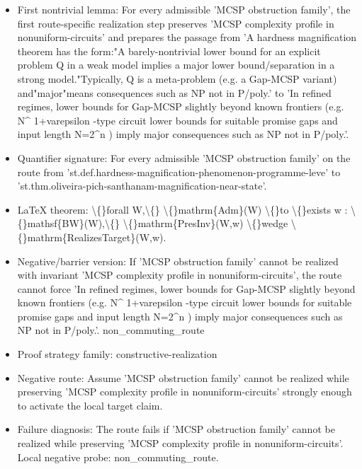 \documentclass[11pt]{article}
\begin{document}
\begin{itemize}
\item First nontrivial lemma: For every admissible 'MCSP obstruction family', the first route-specific realization step preserves 'MCSP complexity profile in nonuniform-circuits' and prepares the passage from 'A hardness magnification theorem has the form:"A barely-nontrivial lower bound for an explicit problem Q in a weak model implies a major lower bound/separation in a strong model."Typically, Q is a meta-problem (e.g. a Gap-MCSP variant) and"major"means consequences such as NP not in P/poly.' to 'In refined regimes, lower bounds for Gap-MCSP slightly beyond known frontiers (e.g. N\textasciicircum{} 1+varepsilon -type circuit lower bounds for suitable promise gaps and input length N=2\textasciicircum{}n ) imply major consequences such as NP not in P/poly.'.
\item Quantifier signature: For every admissible 'MCSP obstruction family' on the route from 'st.def.hardness-magnification-phenomenon-programme-leve' to 'st.thm.oliveira-pich-santhanam-magnification-near-state'.
\item LaTeX theorem: \textbackslash\{\}forall W,\textbackslash\{\} \textbackslash\{\}mathrm\{Adm\}(W) \textbackslash\{\}to \textbackslash\{\}exists w : \textbackslash\{\}mathsf\{BW\}(W),\textbackslash\{\} \textbackslash\{\}mathrm\{PresInv\}(W,w) \textbackslash\{\}wedge \textbackslash\{\}mathrm\{RealizesTarget\}(W,w).
\item Negative/barrier version: If 'MCSP obstruction family' cannot be realized with invariant 'MCSP complexity profile in nonuniform-circuits', the route cannot force 'In refined regimes, lower bounds for Gap-MCSP slightly beyond known frontiers (e.g. N\textasciicircum{} 1+varepsilon -type circuit lower bounds for suitable promise gaps and input length N=2\textasciicircum{}n ) imply major consequences such as NP not in P/poly.'. non\_commuting\_route
\item Proof strategy family: constructive-realization
\item Negative route: Assume 'MCSP obstruction family' cannot be realized while preserving 'MCSP complexity profile in nonuniform-circuits' strongly enough to activate the local target claim.
\item Failure diagnosis: The route fails if 'MCSP obstruction family' cannot be realized while preserving 'MCSP complexity profile in nonuniform-circuits'. Local negative probe: non\_commuting\_route.

\end{itemize}
\end{document}
